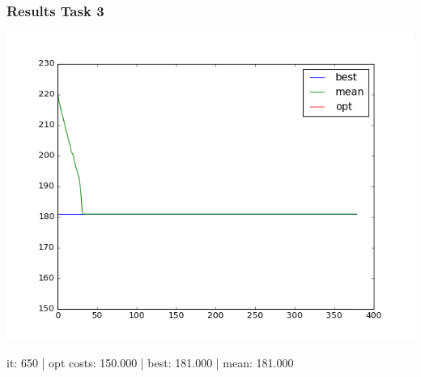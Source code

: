 \documentclass[
]{beamer}
\begin{document}
    \begin{frame}
    	\frametitle{Results Task 3}
		\includegraphics[width=\textwidth]{task3.png}
        \begin{center}
        it:   650 | opt costs: 150.000 | best: 181.000 | mean: 181.000
        \end{center}
    \end{frame}

\end{document}
